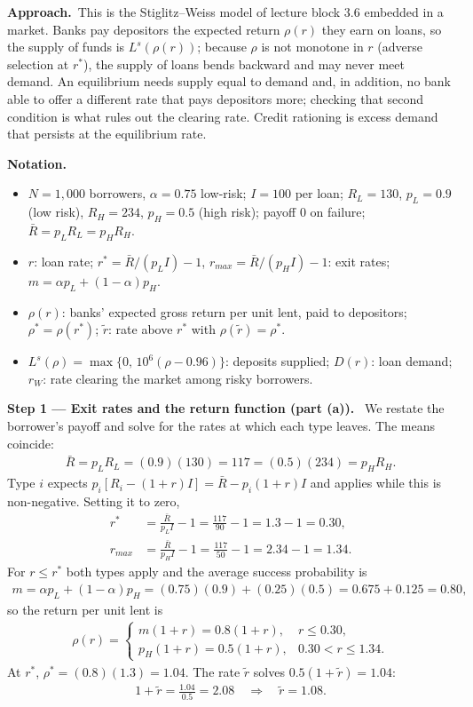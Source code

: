 \documentclass[11pt,a4paper]{article}
\newcommand{\notation}{\par\noindent\textbf{Notation.}}
\newcommand{\step}[2]{\par\medskip\noindent\textbf{Step #1 --- #2.}~}
\newcommand{\approach}{\par\smallskip\noindent\textbf{Approach.}~}
\begin{document}
\approach This is the Stiglitz--Weiss model of lecture block 3.6 embedded in a market. Banks pay depositors the expected return $\rho(r)$ they earn on loans, so the supply of funds is $L^s(\rho(r))$; because $\rho$ is not monotone in $r$ (adverse selection at $r^*$), the supply of loans bends backward and may never meet demand. An equilibrium needs supply equal to demand and, in addition, no bank able to offer a different rate that pays depositors more; checking that second condition is what rules out the clearing rate. Credit rationing is excess demand that persists at the equilibrium rate.

\notation
\begin{itemize}
  \item $N=1{,}000$ borrowers, $\alpha=0.75$ low-risk; $I=100$ per loan; $R_L=130$, $p_L=0.9$ (low risk), $R_H=234$, $p_H=0.5$ (high risk); payoff 0 on failure; $\bar R=p_LR_L=p_HR_H$.
  \item $r$: loan rate; $r^*=\bar R/(p_LI)-1$, $r_{max}=\bar R/(p_HI)-1$: exit rates; $m=\alpha p_L+(1-\alpha)p_H$.
  \item $\rho(r)$: banks' expected gross return per unit lent, paid to depositors; $\rho^*=\rho(r^*)$; $\tilde r$: rate above $r^*$ with $\rho(\tilde r)=\rho^*$.
  \item $L^s(\rho)=\max\{0,\,10^6(\rho-0.96)\}$: deposits supplied; $D(r)$: loan demand; $r_W$: rate clearing the market among risky borrowers.
\end{itemize}

\step{1}{Exit rates and the return function (part (a))} We restate the borrower's payoff and solve for the rates at which each type leaves. The means coincide:
\begin{align}
  \bar R = p_LR_L = (0.9)(130) = 117 = (0.5)(234) = p_HR_H. \nonumber
\end{align}
Type $i$ expects $p_i[R_i-(1+r)I]=\bar R-p_i(1+r)I$ and applies while this is non-negative. Setting it to zero,
\begin{align}
  r^* &= \frac{\bar R}{p_LI}-1 = \frac{117}{90}-1 = 1.3-1 = 0.30, \label{t3e17-rstar}\\
  r_{max} &= \frac{\bar R}{p_HI}-1 = \frac{117}{50}-1 = 2.34-1 = 1.34. \label{t3e17-rmax}
\end{align}
For $r\le r^*$ both types apply and the average success probability is
\begin{align}
  m = \alpha p_L+(1-\alpha)p_H = (0.75)(0.9)+(0.25)(0.5) = 0.675+0.125 = 0.80, \nonumber
\end{align}
so the return per unit lent is
\begin{align}
  \rho(r) = \begin{cases} m(1+r) = 0.8(1+r), & r\le0.30,\\ p_H(1+r) = 0.5(1+r), & 0.30<r\le1.34.\end{cases} \label{t3e17-rho}
\end{align}
At $r^*$, $\rho^*=(0.8)(1.3)=1.04$. The rate $\tilde r$ solves $0.5(1+\tilde r)=1.04$:
\begin{align}
  1+\tilde r = \frac{1.04}{0.5} = 2.08 \quad\Longrightarrow\quad \tilde r = 1.08. \label{t3e17-rtilde}
\end{align}
\end{document}
